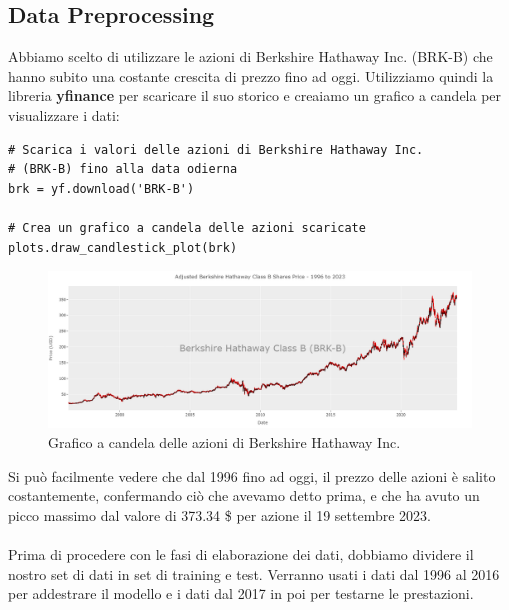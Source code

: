 \documentclass{article}
\begin{document}
\subsection{Data Preprocessing}
Abbiamo scelto di utilizzare le azioni di Berkshire Hathaway Inc. (BRK-B) che hanno subito una costante crescita di prezzo fino ad oggi.  Utilizziamo quindi la libreria \textbf{yfinance} per scaricare il suo storico e creaiamo un grafico a candela per visualizzare i dati:
\begin{verbatim}
# Scarica i valori delle azioni di Berkshire Hathaway Inc. 
# (BRK-B) fino alla data odierna
brk = yf.download('BRK-B')

# Crea un grafico a candela delle azioni scaricate
plots.draw_candlestick_plot(brk)
\end{verbatim}
\begin{figure}[H]
\centering
\includegraphics[width=1\linewidth]{candlestick_plot.png}
\caption{\label{fig:candlestick_plot}Grafico a candela delle azioni di Berkshire Hathaway Inc.}
\end{figure}
Si può facilmente vedere che dal 1996 fino ad oggi, il prezzo delle azioni è salito costantemente, confermando ciò che avevamo detto prima, e che ha avuto un picco massimo dal valore di 373.34 \$ per azione il 19 settembre 2023.\\ \\ 
Prima di procedere con le fasi di elaborazione dei dati, dobbiamo dividere il nostro set di dati in set di training e test. Verranno usati i dati dal 1996 al 2016 per addestrare il modello e i dati dal 2017 in poi per testarne le prestazioni.
\end{document}
